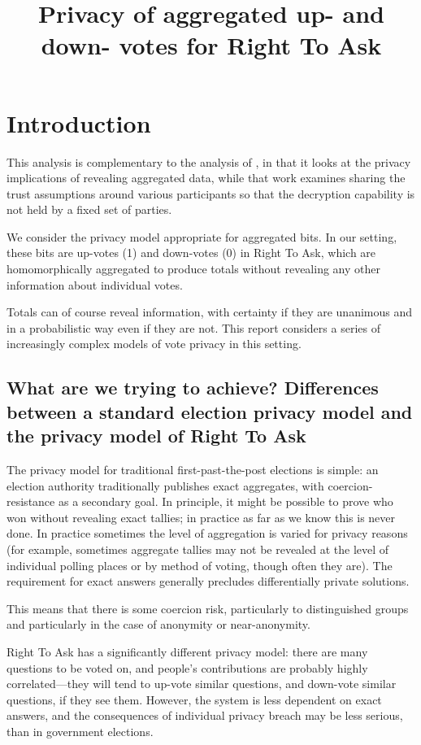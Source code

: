 \documentclass[10pt,a4paper]{article}
\begin{document}
	
	\title{Privacy of aggregated up- and down- votes for Right To Ask}

\section{Introduction}
This analysis is complementary to the analysis of \cite{kiayias2022privacy}, in that it looks at the privacy implications of revealing aggregated data, while that work examines sharing the trust assumptions around various participants so that the decryption capability is not held by a fixed set of parties.

We consider the privacy model appropriate for aggregated bits. In our setting, these bits are up-votes (1) and down-votes (0) in Right To Ask, which are homomorphically aggregated to produce totals without revealing any other information about individual votes.

Totals can of course reveal information, with certainty if they are unanimous and in a probabilistic way even if they are not. This report considers a series of increasingly complex models of vote privacy in this setting.

\subsection{What are we trying to achieve? Differences between a standard election privacy model and the privacy model of Right To Ask}

The privacy model for traditional first-past-the-post elections is simple: an election authority traditionally publishes exact aggregates, with coercion-resistance as a secondary goal. In principle, it might be possible to prove who won without revealing exact tallies; in practice as far as we know this is never done. In practice sometimes the level of aggregation is varied for privacy reasons (for example, sometimes aggregate tallies may not be revealed at the level of individual polling places or by method of voting, though often they are). The requirement for exact answers generally precludes differentially private solutions.

This means that there is some coercion risk, particularly to distinguished groups and particularly in the case of anonymity or near-anonymity. 

Right To Ask has a significantly different privacy model: there are many questions to be voted on, and people's contributions are probably highly correlated---they will tend to up-vote similar questions, and down-vote similar questions, if they see them. However, the system is less dependent on exact answers, and the consequences of individual privacy breach may be less serious, than in government elections.
\end{document}

